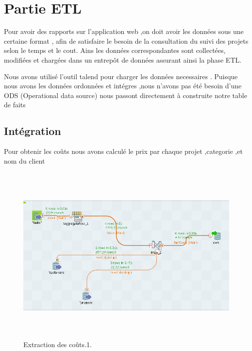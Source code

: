 \section{ Partie ETL }
Pour avoir des rapports sur l'application web ,on doit avoir les donn\'{e}es sous une certaine format ,
afin de satisfaire le besoin de la consultation du suivi des projets selon le temps et le cout.
Ains les donn\'{e}es correspondantes sont collect\'{e}es, modifi\'{e}es et charg\'{e}es dans un entrep\^{o}t de donn\'{e}es
assurant ainsi la phase ETL.

Nous avons utilis\'{e} l'outil talend pour charger les donn\'{e}es necessaires .
Puisque nous avons les donn\'{e}es ordonn\'{e}es et int\'{e}gres ,nous n'avons pas \'{e}t\'{e} besoin d'une ODS (Operational data source)
nous passont directement \`{a} construite notre table de faits



\subsection{Int\'{e}gration}


Pour obtenir les co\^{u}ts nous avons calcul\'{e} le prix par chaque projet ,categorie ,et nom du client

\begin{figure}[H]
\center
\includegraphics[width=14cm,height=9cm]{./figures/integ.png}
\caption{Extraction des co\^{u}ts.1.}
\end{figure}



